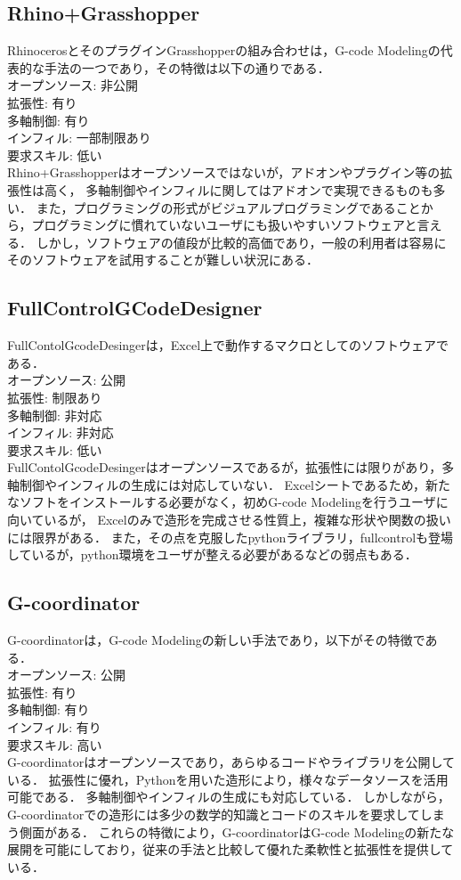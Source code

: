 \documentclass{article}
\begin{document}
\begin{twocolumn}
\subsection{Rhino+Grasshopper}
RhinocerosとそのプラグインGrasshopperの組み合わせは，G-code Modelingの代表的な手法の一つであり，その特徴は以下の通りである．\\
オープンソース: 非公開\\
拡張性: 有り\\
多軸制御: 有り\\
インフィル: 一部制限あり\\
要求スキル: 低い\\
Rhino+Grasshopperはオープンソースではないが，アドオンやプラグイン等の拡張性は高く，
多軸制御やインフィルに関してはアドオンで実現できるものも多い．
また，プログラミングの形式がビジュアルプログラミングであることから，プログラミングに慣れていないユーザにも扱いやすいソフトウェアと言える．
しかし，ソフトウェアの値段が比較的高価であり，一般の利用者は容易にそのソフトウェアを試用することが難しい状況にある．

\subsection{FullControlGCodeDesigner}
FullContolGcodeDesinger\cite{gleadall2021fullcontrol}は，Excel上で動作するマクロとしてのソフトウェアである．\\
オープンソース: 公開\\
拡張性: 制限あり\\
多軸制御: 非対応\\
インフィル: 非対応\\
要求スキル: 低い\\
FullContolGcodeDesingerはオープンソースであるが，拡張性には限りがあり，多軸制御やインフィルの生成には対応していない．
Excelシートであるため，新たなソフトをインストールする必要がなく，初めG-code Modelingを行うユーザに向いているが，
Excelのみで造形を完成させる性質上，複雑な形状や関数の扱いには限界がある．
また，その点を克服したpythonライブラリ，fullcontrolも登場しているが，python環境をユーザが整える必要があるなどの弱点もある．

\subsection{G-coordinator}
G-coordinatorは，G-code Modelingの新しい手法であり，以下がその特徴である．\\
オープンソース: 公開\\
拡張性: 有り\\
多軸制御: 有り\\
インフィル: 有り\\
要求スキル: 高い\\
G-coordinatorはオープンソースであり，あらゆるコードやライブラリを公開している．
拡張性に優れ，Pythonを用いた造形により，様々なデータソースを活用可能である．
多軸制御やインフィルの生成にも対応している．
しかしながら，G-coordinatorでの造形には多少の数学的知識とコードのスキルを要求してしまう側面がある．
これらの特徴により，G-coordinatorはG-code Modelingの新たな展開を可能にしており，従来の手法と比較して優れた柔軟性と拡張性を提供している．


\end{twocolumn}
\end{document}
